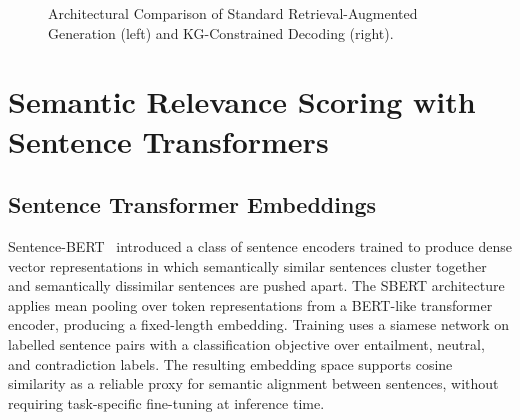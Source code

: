 \begin{figure}[H]
{
  }
  \caption[Architectural Comparison of Standard RAG and KG-Constrained Decoding]{Architectural Comparison of Standard Retrieval-Augmented Generation (left) and KG-Constrained Decoding (right).}
  \label{fig:rag_vs_constrained}
\end{figure}

\section{Semantic Relevance Scoring with Sentence Transformers}
\label{sec:sbert}

\subsection{Sentence Transformer Embeddings}

Sentence-BERT~\citep{reimers2019sbert} introduced a class of sentence encoders trained to produce dense vector representations in which semantically similar sentences cluster together and semantically dissimilar sentences are pushed apart. The SBERT architecture applies mean pooling over token representations from a BERT-like transformer encoder, producing a fixed-length embedding. Training uses a siamese network on labelled sentence pairs with a classification objective over entailment, neutral, and contradiction labels. The resulting embedding space supports cosine similarity as a reliable proxy for semantic alignment between sentences, without requiring task-specific fine-tuning at inference time.

